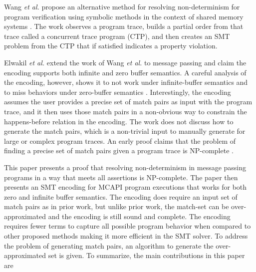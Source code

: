 Wang \textit{et al.} propose an alternative method for resolving
non-determinism for program verification using symbolic methods in the context
of shared memory systems \cite{wang:fse09}. The work observes a
program trace, builds a partial order from that trace called a
concurrent trace program (CTP), and then creates an SMT problem from
the CTP that if satisfied indicates a property violation.

\examplefigone

Elwakil \textit{et al.} extend the work of Wang \textit{et al.} to
message passing and claim the encoding supports both infinite and zero buffer semantics. A
careful analysis of the encoding, however, shows it to not work under
infinite-buffer semantics and to miss behaviors under zero-buffer
semantics \cite{elwakil:padtad10}. Interestingly, the encoding assumes
the user provides a precise set of match pairs as input with the
program trace, and it then uses those match pairs in a non-obvious way
to constrain the happens-before relation in the encoding. The work
does not discuss how to generate the match pairs, which is a
non-trivial input to manually generate for large or complex program
traces. An early proof claims that the problem of finding a precise
set of match pairs given a program trace is NP-complete
\cite{match-pair-np-complete}.

 This paper presents a proof that resolving non-determinism in message
 passing programs in a way that meets all assertions is
 NP-complete. The paper then presents an SMT encoding for MCAPI
 program executions that works for both zero and infinite buffer
 semantics. The encoding does require an input set of match pairs as
 in prior work, but unlike prior work, the match-set can be
 over-approximated and the encoding is still sound and complete. The
 encoding requires fewer terms to capture all possible program
 behavior when compared to other proposed methods making it more
 efficient in the SMT solver.  To address the problem of generating
 match pairs, an algorithm to generate the over-approximated set is
 given. To summarize, the main contributions in this paper are

